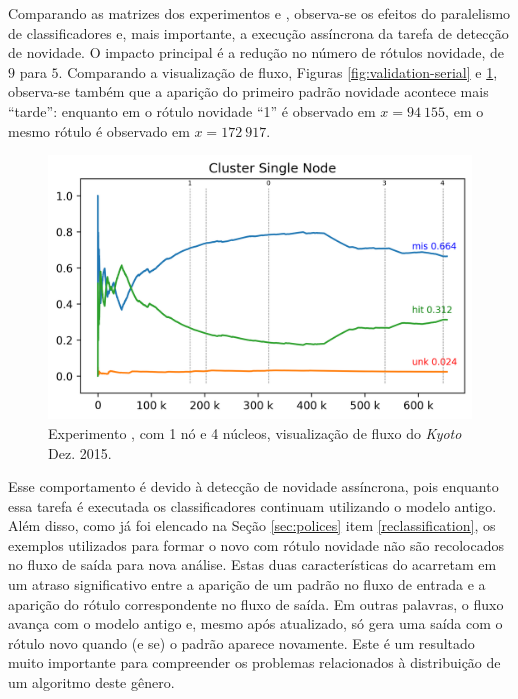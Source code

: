 
Comparando as matrizes dos experimentos \expB e \expC, observa-se os
efeitos do paralelismo de classificadores e, mais importante, a execução
assíncrona da tarefa de detecção de novidade.
O impacto principal é a redução no número de rótulos novidade, de $9$ para $5$.
Comparando a visualização de fluxo, Figuras \ref{fig:validation-serial} e
\ref{fig:single-flow}, observa-se também que a aparição do primeiro padrão
novidade acontece mais ``tarde'': enquanto em \expB o rótulo novidade ``1'' é
observado em $x = 94\:155$, em \expC o mesmo rótulo é observado em $x =
172\:917$.

\begin{figure}[htb]
  \centering
  \includegraphics[width=0.75\linewidth]{experiments/tmi-base-log.png}
  \caption{Experimento \expC, \mfog com 1 nó e 4 núcleos, visualização de fluxo
  do \dataset \emph{Kyoto} Dez. 2015.}
  \label{fig:single-flow}
\end{figure}

Esse comportamento é devido à detecção de novidade assíncrona, pois enquanto
essa tarefa é executada os classificadores continuam utilizando o modelo antigo.
Além disso, como já foi elencado na Seção \ref{sec:polices} item
\ref{reclassification}, os exemplos utilizados para formar o novo \mcluster
com rótulo novidade não são recolocados no fluxo de saída para nova análise.
Estas duas características do \mfog acarretam em um atraso significativo entre a
aparição de um padrão no fluxo de entrada e a aparição do rótulo correspondente
no fluxo de saída.
Em outras palavras, o fluxo avança com o modelo antigo e, mesmo após atualizado,
só gera uma saída com o rótulo novo quando (e se) o padrão aparece novamente.
Este é um resultado muito importante para compreender os problemas relacionados
à distribuição de um algoritmo deste gênero.

